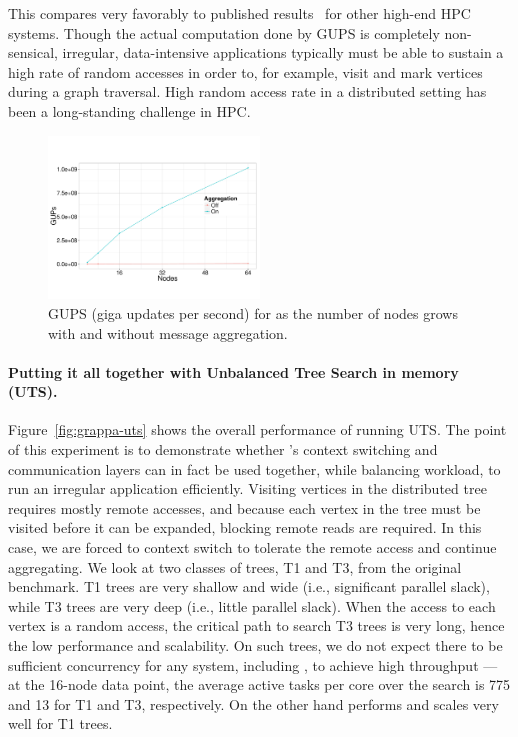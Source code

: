 This compares very favorably to published results~\cite{gups} for other
high-end HPC systems. Though the actual computation done by GUPS is completely
non-sensical, irregular, data-intensive applications typically must be able to
sustain a high rate of random accesses in order to, for example, visit and
mark vertices during a graph traversal. High random access rate in a
distributed setting has been a long-standing challenge in HPC.

\begin{figure}[ht]
    \begin{center}
      \includegraphics[width=0.5\textwidth]{figs/gups.pdf}
    \end{center}
    \caption{GUPS (giga updates per second) for \Grappa as the number of nodes grows with and without message aggregation.}
    \label{fig:grappa-gups}
\end{figure}

\paragraph{Putting it all together with Unbalanced Tree Search in memory
(UTS).} 
Figure~\ref{fig:grappa-uts} shows the overall performance of \Grappa running
UTS. The point of this experiment is to demonstrate whether \Grappa's context
switching and communication layers can in fact be used together, while
balancing workload, to run an irregular application efficiently. Visiting
vertices in the distributed tree requires mostly remote accesses, and because
each vertex in the tree must be visited before it can be expanded, blocking
remote reads are required. 
In this case, we are forced to context switch to tolerate the remote access and continue aggregating. 
We look at two classes of trees, T1 and T3, from
the original benchmark. T1 trees are very shallow and wide (i.e., significant
parallel slack), while T3 trees are very deep (i.e., little parallel slack).
When the access to each vertex is a random access, the critical path to search
T3 trees is very long, hence the low performance and scalability. On such
trees, we do not expect there to be sufficient concurrency for any system,
including \Grappa, to achieve high throughput --- at the 16-node data point,
the average active tasks per core over the search is 775 and 13 for T1 and T3,
respectively. On the other hand \Grappa performs and scales very well for T1
trees.


